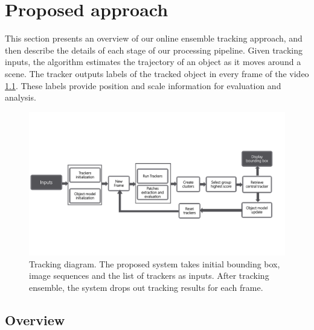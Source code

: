\chapter{Proposed approach} %

\label{chapter3} %


This section presents an overview of our online ensemble
tracking approach, and then describe the details of each stage of our
processing pipeline. Given tracking inputs, the algorithm estimates the
trajectory of an object as it moves around a scene. The tracker outputs labels
of the tracked object in every frame of the video \ref{fig::global_diagram}.
These labels provide position and scale information for evaluation and analysis.

\begin{figure}[h!]
\centering
\includegraphics[page=2, width=0.8\linewidth, trim= 0cm 5.1cm 6cm 5.3cm,
                 clip=true]{Figures/global_diagram}
\caption[Tracking diagram]{\small Tracking diagram. The proposed system takes
        initial bounding box, image sequences and the list of trackers as inputs.
        After tracking ensemble, the system drops out tracking results for each
        frame.}
\label{fig::global_diagram}
\end{figure}


\section{Overview}

